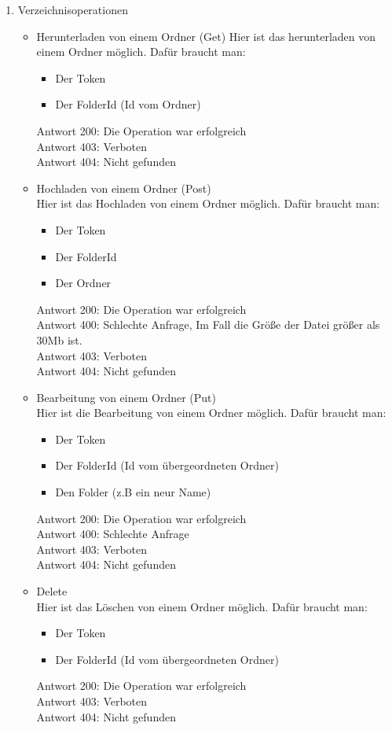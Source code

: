 \begin{enumerate}
\item Verzeichnisoperationen
\begin{itemize}
\item Herunterladen von einem Ordner (Get)
Hier ist das herunterladen von einem Ordner m\"oglich. Daf\"ur braucht man: 
\begin{itemize}
\item Der Token
\item Der FolderId (Id vom Ordner) 
\end{itemize}
Antwort 200: Die Operation war erfolgreich \\ 
Antwort 403: Verboten \\
Antwort 404: Nicht gefunden
\item Hochladen von einem Ordner (Post) \\
Hier ist das Hochladen von einem Ordner m\"oglich. Daf\"ur braucht man:
\begin{itemize}
\item Der Token
\item Der FolderId 
\item Der Ordner 
\end{itemize}
Antwort 200: Die Operation war erfolgreich \\ 
Antwort 400: Schlechte Anfrage, Im Fall die Gr\"o{\ss}e der Datei gr\"o{\ss}er als 30Mb ist. \\
Antwort 403: Verboten \\
Antwort 404: Nicht gefunden
\item Bearbeitung von einem Ordner (Put) \\
Hier ist die Bearbeitung von einem Ordner m\"oglich. Daf\"ur braucht man: 
\begin{itemize}
\item Der Token
\item Der FolderId (Id vom \"ubergeordneten Ordner) 
\item Den Folder (z.B ein neur Name) 
\end{itemize}
Antwort 200: Die Operation war erfolgreich \\ 
Antwort 400: Schlechte Anfrage \\
Antwort 403: Verboten \\
Antwort 404: Nicht gefunden
\item Delete \\
Hier ist das L\"oschen von einem Ordner m\"oglich. Daf\"ur braucht man: 
\begin{itemize}
\item Der Token
\item Der FolderId (Id vom \"ubergeordneten Ordner) 
\end{itemize}
Antwort 200: Die Operation war erfolgreich \\ 
Antwort 403: Verboten \\
Antwort 404: Nicht gefunden
\end{itemize}
\end{enumerate}
